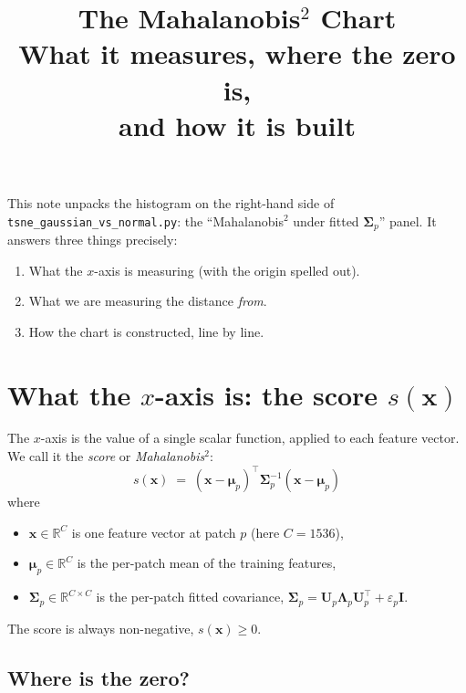 \documentclass[11pt]{article}
\title{The Mahalanobis$^2$ Chart \\
       \large What it measures, where the zero is,\\ and how it is built}
\author{}
\date{}
\newcommand{\code}[1]{\texttt{#1}}
\newcommand{\Up}{\mathbf{U}_p}
\newcommand{\Lp}{\boldsymbol{\Lambda}_p}
\newcommand{\bmu}{\boldsymbol{\mu}}
\newcommand{\bSigma}{\boldsymbol{\Sigma}}
\newcommand{\R}{\mathbb{R}}
\begin{document}
\maketitle

\noindent
This note unpacks the histogram on the right-hand side of
\code{tsne\_gaussian\_vs\_normal.py}: the ``Mahalanobis$^2$ under fitted
$\bSigma_p$'' panel. It answers three things precisely:
\begin{enumerate}[noitemsep]
  \item What the $x$-axis is measuring (with the origin spelled out).
  \item What we are measuring the distance \emph{from}.
  \item How the chart is constructed, line by line.
\end{enumerate}

\tableofcontents

\section{What the $x$-axis is: the score \texorpdfstring{$s(\mathbf{x})$}{s(x)}}

The $x$-axis is the value of a single scalar function, applied to each feature
vector. We call it the \emph{score} or \emph{Mahalanobis$^2$}:
\begin{equation}
  \boxed{\; s(\mathbf{x}) \;=\; (\mathbf{x} - \bmu_p)^\top \bSigma_p^{-1} (\mathbf{x} - \bmu_p) \;}
  \label{eq:mahal-def}
\end{equation}
where
\begin{itemize}[noitemsep]
  \item $\mathbf{x} \in \R^{C}$ is one feature vector at patch $p$ (here $C=1536$),
  \item $\bmu_p \in \R^{C}$ is the per-patch mean of the training features,
  \item $\bSigma_p \in \R^{C \times C}$ is the per-patch fitted covariance,
    $\bSigma_p = \Up \Lp \Up^\top + \varepsilon_p \mathbf{I}$.
\end{itemize}
The score is always non-negative, $s(\mathbf{x}) \ge 0$.

\subsection{Where is the zero?}
\end{document}
